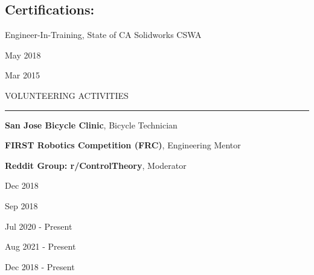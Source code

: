 \documentclass[letterpaper,10pt,oneside]{article}
\begin{document}
\begin{body}
\vspace{-2.5ex}
\section
{Certifications:}{}

\vspace{-2.0ex}
\begin{detail}
Engineer-In-Training, State of CA 
\newline
Solidworks CSWA 
\end{detail}

\begin{subtitle}
\vspace{-8ex}
{{May 2018}}

{{Mar 2015}}
\end{subtitle}

\vspace{-1ex}


{
\hspace{-1.72in}\noindent\color{cblue}
{VOLUNTEERING ACTIVITIES} %
}

\vspace{-1.6ex}
{\hspace{-1.73in}\noindent\color{dblue}\rule{6.935in}{0.4pt}} %
\vspace{-2ex}

{\hspace{-1.73in}\small
\textbf{San Jose Bicycle Clinic}, Bicycle Technician }

{\hspace{-1.73in}\small
\textbf{FIRST Robotics Competition (FRC)}, Engineering Mentor }

{\hspace{-1.73in}\small
\textbf{Reddit Group: r/ControlTheory}, Moderator}

\begin{subtitle}
\vspace{-40ex}
{{Dec 2018}}

\vspace{4ex}
{{Sep 2018}}

\vspace{20ex}
{{Jul 2020 - Present}}

{{Aug 2021 - Present}}

{{Dec 2018 - Present}}

\end{subtitle}


\end{body}
\end{document}
